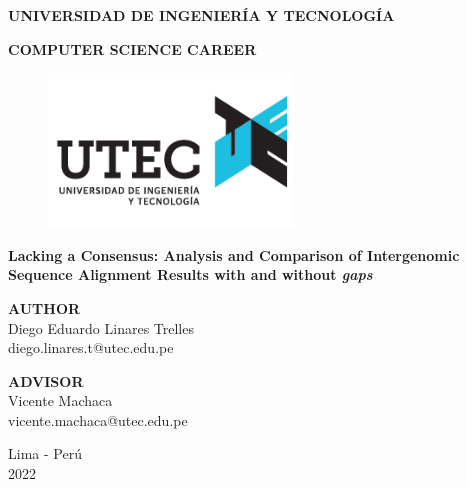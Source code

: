 \begin{titlepage}
  \begin{center}
      \Large
      \textbf{UNIVERSIDAD DE INGENIERÍA Y TECNOLOGÍA}
      \vspace*{1cm}

      \large
      \textbf{COMPUTER SCIENCE CAREER}
      \vspace*{1cm}

      \begin{figure}[htbp]
          \centering
          \includegraphics[width=6.5cm,height=\textheight,keepaspectratio]{images/logo}
      \end{figure}


      \LARGE
      \textbf{Lacking a Consensus: Analysis and Comparison of Intergenomic Sequence Alignment Results with and without \textit{gaps}}

      \vspace{1.0cm}
      \Large


      \textbf{AUTHOR}
      \vspace{0.5cm}
      \\Diego Eduardo Linares Trelles
      \\diego.linares.t@utec.edu.pe
      \vfill

      \vspace{1.0cm}

      \textbf{ADVISOR}
      \vspace{0.5cm}
      \\Vicente Machaca
      \\vicente.machaca@utec.edu.pe
      \vfill
      \vspace{0.8cm}
      \Large

      Lima - Perú
      \\
      2022

  \end{center}
\end{titlepage}
